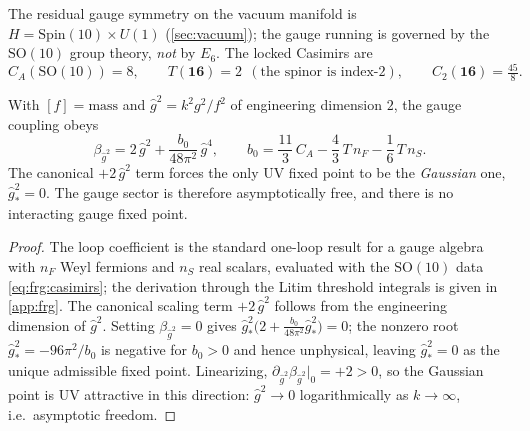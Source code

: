 The residual gauge symmetry on the vacuum manifold is $H=\mathrm{Spin}(10)\times U(1)$
(\autoref{sec:vacuum}); the gauge running is governed by the
\emph{$\mathrm{SO}(10)$} group theory, \emph{not} by $E_{6}$. The locked
Casimirs are
\begin{equation}\label{eq:frg:casimirs}
  C_{A}\!\left(\mathrm{SO}(10)\right)=8,\qquad
  T(\mathbf{16})=2\ \ (\text{the spinor is index-}2),\qquad
  C_{2}(\mathbf{16})=\tfrac{45}{8}.
\end{equation}

\begin{theorem}
\label{thm:frg:gauge}
With $[f]=\text{mass}$ and $\hat g^{2}=k^{2}g^{2}/f^{2}$ of engineering
dimension $2$, the gauge coupling obeys
\begin{equation}\label{eq:frg:betag}
  \beta_{\hat g^{2}}
  = 2\,\hat g^{2}
    + \frac{b_{0}}{48\pi^{2}}\,\hat g^{4},
  \qquad
  b_{0}=\frac{11}{3}\,C_{A}-\frac{4}{3}\,T\,n_{F}-\frac16\,T\,n_{S}.
\end{equation}
The canonical $+2\,\hat g^{2}$ term forces the only UV fixed point to be
the \emph{Gaussian} one, $\hat g^{2}_{\ast}=0$. The gauge sector is
therefore asymptotically free, and there is no interacting gauge fixed
point.
\end{theorem}

\begin{proof}
The loop coefficient is the standard one-loop result for a gauge algebra
with $n_{F}$ Weyl fermions and $n_{S}$ real scalars, evaluated with the
$\mathrm{SO}(10)$ data \eqref{eq:frg:casimirs}; the derivation through the
Litim threshold integrals is given in \autoref{app:frg}. The canonical
scaling term $+2\,\hat g^{2}$ follows from the engineering dimension of
$\hat g^{2}$. Setting $\beta_{\hat g^{2}}=0$ gives
$\hat g^{2}_{\ast}\bigl(2+\tfrac{b_{0}}{48\pi^{2}}\hat g^{2}_{\ast}\bigr)=0$;
the nonzero root $\hat g^{2}_{\ast}=-96\pi^{2}/b_{0}$ is negative for
$b_{0}>0$ and hence unphysical, leaving $\hat g^{2}_{\ast}=0$ as the unique
admissible fixed point. Linearizing, $\partial_{\hat g^{2}}\beta_{\hat g^{2}}|_{0}=+2>0$,
so the Gaussian point is UV attractive in this direction: $\hat g^{2}\to0$
logarithmically as $k\to\infty$, i.e.\ asymptotic freedom.
\end{proof}

